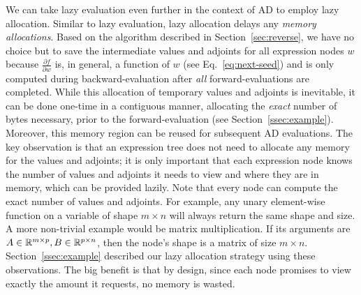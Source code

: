 We can take lazy evaluation even further in the context of AD to employ lazy allocation.
Similar to lazy evaluation, lazy allocation delays any \emph{memory allocations}.
Based on the algorithm described in Section~\ref{sec:reverse},
we have no choice but to save the intermediate values and adjoints for all expression nodes $w$
because $\frac{\partial f}{\partial w}$ is, in general, a function of $w$ (see Eq.~\ref{eq:next-seed})
and is only computed during backward-evaluation after \emph{all} forward-evaluations are completed.
While this allocation of temporary values and adjoints is inevitable,
it can be done one-time in a contiguous manner, allocating the \emph{exact} number of bytes necessary,
prior to the forward-evaluation (see Section~\ref{ssec:example}).
Moreover, this memory region can be reused for subsequent AD evaluations.
The key observation is that an expression tree 
does not need to allocate any memory for the values and adjoints;
it is only important that each expression node knows 
the number of values and adjoints it needs to view
and where they are in memory, which can be provided lazily.
Note that every node can compute the exact number of values and adjoints.
For example, any unary element-wise function on a variable of shape $m \times n$ 
will always return the same shape and size.
A more non-trivial example would be matrix multiplication.
If its arguments are $A \in \mathbb{R}^{m \times p}, B \in \mathbb{R}^{p \times n}$, then
the node's shape is a matrix of size $m \times n$.
Section~\ref{ssec:example} described our lazy allocation strategy using these observations.
The big benefit is that by design, 
since each node promises to view exactly the amount it requests, no memory is wasted.
